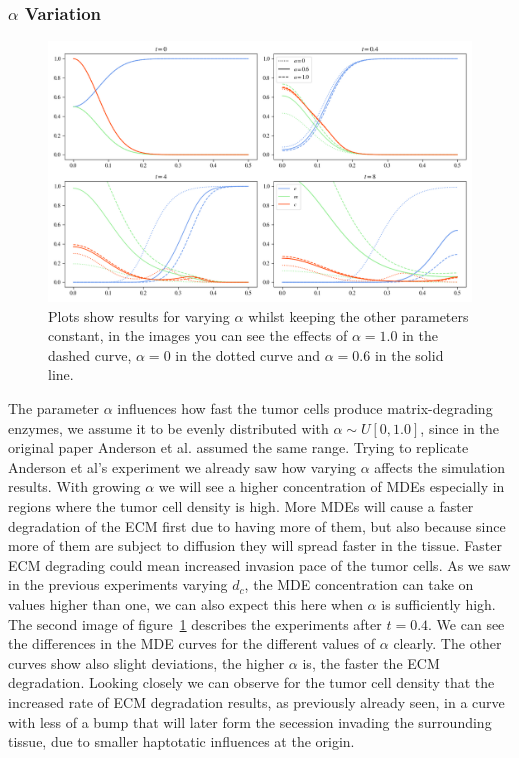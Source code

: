 \subsubsection*{$\alpha$ Variation}
\begin{figure}[h]
    \centering
    \includegraphics[width=\textwidth]{resources/images/alpha_variation.png}
    \caption{Plots show results for varying $\alpha$ whilst keeping the other parameters constant, in the images you can see the effects of $\alpha=1.0$ in the dashed curve, $\alpha=0$ in the dotted curve and $\alpha=0.6$ in the solid line.}
    \label{fig:alpha_variation}
\end{figure}
The parameter $\alpha$ influences how fast the tumor cells produce matrix-degrading enzymes, we assume it to be evenly distributed with $\alpha \sim U[0, 1.0]$, since in the original paper Anderson et al. assumed the same range. Trying to replicate Anderson et al's experiment we already saw how varying $\alpha$ affects the simulation results. With growing $\alpha$ we will see a higher concentration of MDEs especially in regions where the tumor cell density is high. More MDEs will cause a faster degradation of the ECM first due to having more of them, but also because since more of them are subject to diffusion they will spread faster in the tissue. Faster ECM degrading could mean increased invasion pace of the tumor cells. As we saw in the previous experiments varying $d_c$, the MDE concentration can take on values higher than one, we can also expect this here when $\alpha$ is sufficiently high. \newline 
The second image of figure~\ref{fig:alpha_variation} describes the experiments after $t=0.4$. We can see the differences in the MDE curves for the different values of $\alpha$ clearly. The other curves show also slight deviations, the higher $\alpha$ is, the faster the ECM degradation. Looking closely we can observe for the tumor cell density that the increased rate of ECM degradation results, as previously already seen, in a curve with less of a bump that will later form the secession invading the surrounding tissue, due to smaller haptotatic influences at the origin.\newline 
